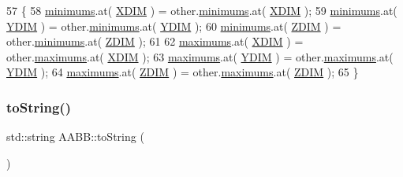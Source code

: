 \begin{DoxyCode}
57 \{
58     \hyperlink{class_a_a_b_b_aaf1ec35e5c0258cd57e65429f93c14a2}{minimums}.at( \hyperlink{class_a_a_b_b_aac753e0248d039329b25b38d0ed9cd4f}{XDIM} ) = other.\hyperlink{class_a_a_b_b_aaf1ec35e5c0258cd57e65429f93c14a2}{minimums}.at( \hyperlink{class_a_a_b_b_aac753e0248d039329b25b38d0ed9cd4f}{XDIM} );
59     \hyperlink{class_a_a_b_b_aaf1ec35e5c0258cd57e65429f93c14a2}{minimums}.at( \hyperlink{class_a_a_b_b_a5192e3bdf0789cdc9e5f643b401e5b10}{YDIM} ) = other.\hyperlink{class_a_a_b_b_aaf1ec35e5c0258cd57e65429f93c14a2}{minimums}.at( \hyperlink{class_a_a_b_b_a5192e3bdf0789cdc9e5f643b401e5b10}{YDIM} );
60     \hyperlink{class_a_a_b_b_aaf1ec35e5c0258cd57e65429f93c14a2}{minimums}.at( \hyperlink{class_a_a_b_b_a3e78cd8baa6ab6199afb2cb014e0db62}{ZDIM} ) = other.\hyperlink{class_a_a_b_b_aaf1ec35e5c0258cd57e65429f93c14a2}{minimums}.at( \hyperlink{class_a_a_b_b_a3e78cd8baa6ab6199afb2cb014e0db62}{ZDIM} );
61 
62     \hyperlink{class_a_a_b_b_a1289c3a2e5c7a98f90d5bcdb8251a06f}{maximums}.at( \hyperlink{class_a_a_b_b_aac753e0248d039329b25b38d0ed9cd4f}{XDIM} ) = other.\hyperlink{class_a_a_b_b_a1289c3a2e5c7a98f90d5bcdb8251a06f}{maximums}.at( \hyperlink{class_a_a_b_b_aac753e0248d039329b25b38d0ed9cd4f}{XDIM} );
63     \hyperlink{class_a_a_b_b_a1289c3a2e5c7a98f90d5bcdb8251a06f}{maximums}.at( \hyperlink{class_a_a_b_b_a5192e3bdf0789cdc9e5f643b401e5b10}{YDIM} ) = other.\hyperlink{class_a_a_b_b_a1289c3a2e5c7a98f90d5bcdb8251a06f}{maximums}.at( \hyperlink{class_a_a_b_b_a5192e3bdf0789cdc9e5f643b401e5b10}{YDIM} );
64     \hyperlink{class_a_a_b_b_a1289c3a2e5c7a98f90d5bcdb8251a06f}{maximums}.at( \hyperlink{class_a_a_b_b_a3e78cd8baa6ab6199afb2cb014e0db62}{ZDIM} ) = other.\hyperlink{class_a_a_b_b_a1289c3a2e5c7a98f90d5bcdb8251a06f}{maximums}.at( \hyperlink{class_a_a_b_b_a3e78cd8baa6ab6199afb2cb014e0db62}{ZDIM} );
65 \}
\end{DoxyCode}
\mbox{\label{class_a_a_b_b_af66da47bd15d679936e05af231b45b75}} 
\subsubsection{\texorpdfstring{to\+String()}{toString()}}
{\footnotesize\ttfamily std\+::string A\+A\+B\+B\+::to\+String (\begin{DoxyParamCaption}{ }\end{DoxyParamCaption})}




